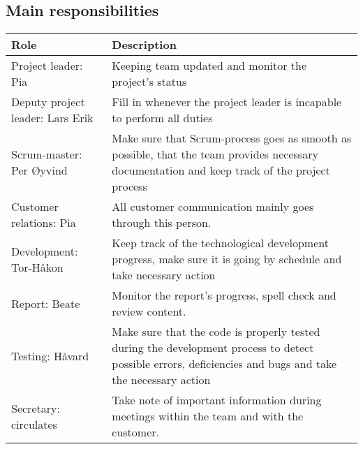\subsection{Main responsibilities}
\begin{table}[H]
\centering
{}
\begin{tabular}{|l|p{7cm}|}
\hline
\textbf{Role} & \textbf{Description}\\\hline
Project leader: Pia & Keeping team updated and monitor the project's status\\\hline
Deputy project leader: Lars Erik & Fill in whenever the project leader is incapable to perform all duties\\\hline
Scrum-master: Per Øyvind & Make sure that Scrum-process goes as smooth as possible, that the team provides necessary documentation and keep track of the project process\\\hline
Customer relations: Pia & All customer communication mainly goes through this person.\\\hline
Development: Tor-Håkon & Keep track of the technological development progress, make sure it is going by schedule and take necessary action \\\hline
Report: Beate & Monitor the report's progress, spell check and review content.\\\hline
Testing: Håvard & Make sure that the code is properly tested during the development process to detect possible errors, deficiencies and bugs and take the necessary action \\\hline
Secretary: circulates & Take note of important information during meetings within the team and with the customer.\\\hline
\end{tabular}
\end{table}